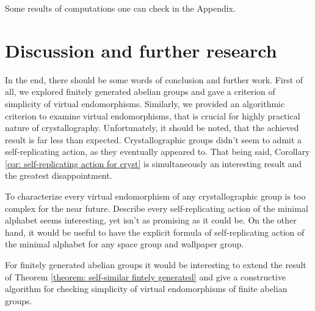\documentclass[a4paper,12pt]{amsart}
\theoremstyle{definition}
\begin{document}
	Some results of computations one can check in the Appendix. 	
	
	\newpage
	
	\section{Discussion and further research}
		In the end, there should be some words of conclusion and further work. First of all, we explored finitely generated abelian groups and gave a criterion of simplicity of virtual endomorphisms. Similarly, we provided an algorithmic criterion to examine virtual endomorphisms, that is crucial for highly practical nature of crystallography. Unfortunately, it should be noted, that the achieved result is far less than expected. Crystallographic groups didn't seem to admit a  self-replicating action, as they eventually appeared to. That being said, Corollary \ref{cor: self-replicating action for cryst} is simultaneously an interesting result and the greatest disappointment. 
		
		To characterize every virtual endomorphism of any crystallographic group is too complex for the near future. Describe every self-replicating action of the minimal alphabet seems interesting, yet isn't as promising as it could be. On the other hand, it would be useful to have the explicit formula of self-replicating action of the minimal alphabet for any space group and wallpaper group. 
		
		For finitely generated abelian groups it would be interesting to extend the result of Theorem \ref{theorem: self-similar fintely generated} and give a constructive algorithm for checking simplicity of virtual endomorphisms of finite abelian groups.  
		
	\newpage 
	
\end{document}

